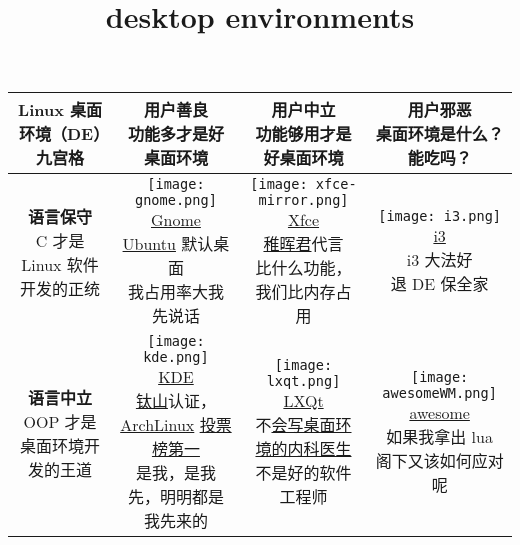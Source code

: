 \documentclass{standalone}
\title{desktop environments}
\begin{document}
\begin{tabular}{|c|c|c|c|}
  \hline
  Linux 桌面环境（DE）九宫格 &
  \makecell{\textbf{用户善良}                                \\功能多才是好桌面环境} &
  \makecell{\textbf{用户中立}                                \\功能够用才是好桌面环境} &
  \makecell{\textbf{用户邪恶}                                \\桌面环境是什么？能吃吗？}
  \\\hline
  \makecell{\textbf{语言保守}                                \\C 才是 Linux 软件开发的正统} &
  \makecell{\texttt{[image: gnome.png]}       \\\href{https://www.gnome.org/}{Gnome}\\\href{https://ubuntu.com/}{Ubuntu} 默认桌面\\我占用率大我先说话} &
  \makecell{\texttt{[image: xfce-mirror.png]} \\\href{https://www.xfce.org}{Xfce}\\\href{https://github.com/peng-zhihui/}{稚晖君}代言\\比什么功能，我们比内存占用} &
  \makecell{\texttt{[image: i3.png]}          \\\href{https://i3wm.org/}{i3}\\i3 大法好\\退 DE 保全家}
  \\\hline
  \makecell{\textbf{语言中立}                                \\OOP 才是桌面环境开发的王道} &
  \makecell{\texttt{[image: kde.png]}         \\\href{https://kde.org/}{KDE}\\\href{https://tysontan.com/}{钛山}认证， \href{https://archlinux.org/}{ArchLinux} \href{https://pkgstats.archlinux.de/fun/}{投票榜第一}\\是我，是我先，明明都是我先来的} &
  \makecell{\texttt{[image: lxqt.png]}        \\\href{https://lxqt-project.org/}{LXQt}\\不\href{https://github.com/PCMan/}{会写桌面环境的内科医生}\\不是好的软件工程师} &
  \makecell{\texttt{[image: awesomeWM.png]}   \\\href{https://awesomewm.org/}{awesome}\\如果我拿出 lua\\阁下又该如何应对呢}

\end{tabular}
\end{document}
